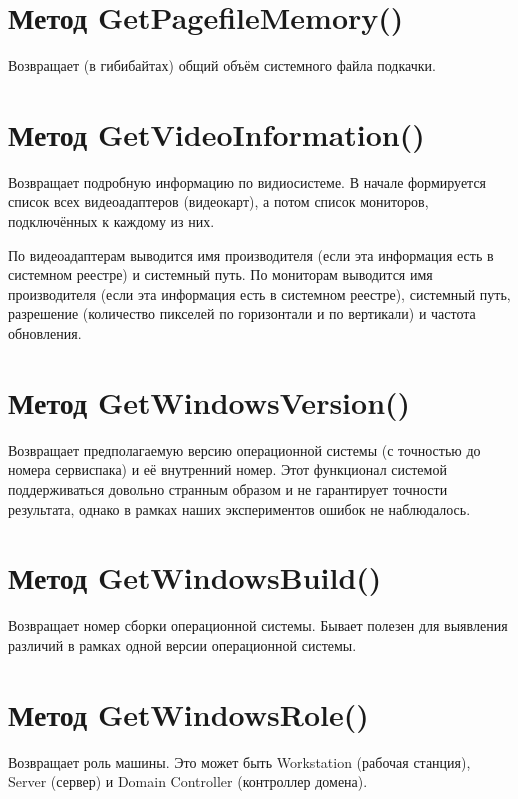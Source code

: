 \documentclass[a4paper, 12pt]{report}		%
\begin{document}
\section*{Метод GetPagefileMemory()}
Возвращает (в гибибайтах) общий объём системного файла подкачки.

\section*{Метод GetVideoInformation()}
Возвращает подробную информацию по видиосистеме. В начале формируется список всех видеоадаптеров (видеокарт), а потом список мониторов, подключённых к каждому из них.
\vspace{1em}

По видеоадаптерам выводится имя производителя (если эта информация есть в системном реестре) и системный путь. По мониторам выводится имя производителя (если эта информация есть в системном реестре), системный путь, разрешение (количество пикселей по горизонтали и по вертикали) и частота обновления.

\section*{Метод GetWindowsVersion()}
Возвращает предполагаемую версию операционной системы (с точностью до номера сервиспака) и её внутренний номер. Этот функционал системой поддерживаться довольно странным образом и не гарантирует точности результата, однако в рамках наших экспериментов ошибок не наблюдалось.

\section*{Метод GetWindowsBuild()}
Возвращает номер сборки операционной системы. Бывает полезен для выявления различий в рамках одной версии операционной системы.

\section*{Метод GetWindowsRole()}
Возвращает роль машины. Это может быть Workstation (рабочая станция), Server (сервер) и Domain Controller (контроллер домена).
\end{document}
